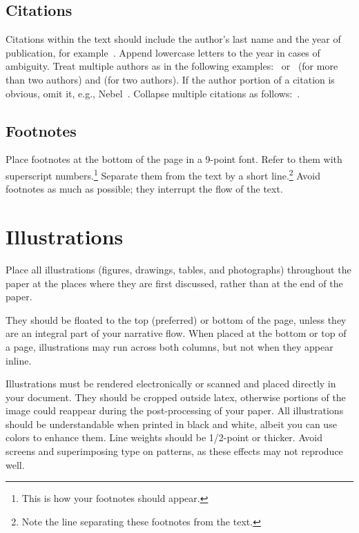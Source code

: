 \documentclass{article}
\begin{document}
\subsection{Citations}

Citations within the text should include the author's last name and
the year of publication, for example~\cite{gottlob:nonmon}.  Append
lowercase letters to the year in cases of ambiguity.  Treat multiple
authors as in the following examples:~\cite{abelson-et-al:scheme}
or~\cite{bgf:Lixto} (for more than two authors) and
\cite{brachman-schmolze:kl-one} (for two authors).  If the author
portion of a citation is obvious, omit it, e.g.,
Nebel~.  Collapse multiple citations as
follows:~\cite{gls:hypertrees,levesque:functional-foundations}.
\nocite{abelson-et-al:scheme}
\nocite{bgf:Lixto}
\nocite{brachman-schmolze:kl-one}
\nocite{gottlob:nonmon}
\nocite{gls:hypertrees}
\nocite{levesque:functional-foundations}
\nocite{levesque:belief}
\nocite{nebel:jair-2000}

\subsection{Footnotes}

Place footnotes at the bottom of the page in a 9-point font.  Refer to
them with superscript numbers.\footnote{This is how your footnotes
should appear.} Separate them from the text by a short
line.\footnote{Note the line separating these footnotes from the
text.} Avoid footnotes as much as possible; they interrupt the flow of
the text.

\section{Illustrations}

Place all illustrations (figures, drawings, tables, and photographs)
throughout the paper at the places where they are first discussed,
rather than at the end of the paper.

They should be floated to the top (preferred) or bottom of the page, 
unless they are an integral part 
of your narrative flow. When placed at the bottom or top of
a page, illustrations may run across both columns, but not when they
appear inline.

Illustrations must be rendered electronically or scanned and placed
directly in your document. They should be cropped outside latex, otherwise portions of the image could reappear during the post-processing of your paper. All illustrations should be understandable when printed in black and
white, albeit you can use colors to enhance them. Line weights should
be 1/2-point or thicker. Avoid screens and superimposing type on
patterns, as these effects may not reproduce well.
\end{document}
